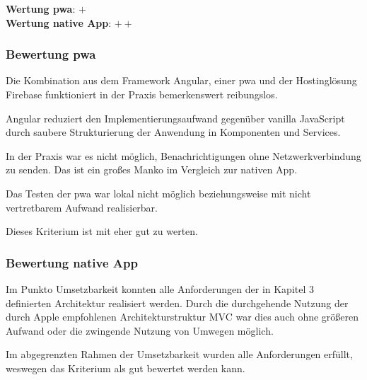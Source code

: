 \textbf{Wertung \ac{pwa}}: $+$\\
\textbf{Wertung native App}: $++$ \\

\subsubsection{Bewertung \ac{pwa}}
Die Kombination aus dem Framework Angular, einer \ac{pwa} und der Hostinglösung Firebase funktioniert in der Praxis bemerkenswert reibungslos.

Angular reduziert den Implementierungsaufwand gegenüber vanilla JavaScript durch saubere Strukturierung der Anwendung in Komponenten und Services.

In der Praxis war es nicht möglich, Benachrichtigungen ohne Netzwerkverbindung zu senden. Das ist ein großes Manko im Vergleich zur nativen App.

Das Testen der \ac{pwa} war lokal nicht möglich beziehungsweise mit nicht vertretbarem Aufwand realisierbar.

Dieses Kriterium ist mit eher gut zu werten.

\subsubsection{Bewertung native App}
Im Punkto Umsetzbarkeit konnten alle Anforderungen der in Kapitel 3 definierten Architektur realisiert werden. Durch die durchgehende Nutzung der durch Apple empfohlenen Architekturstruktur MVC war dies auch ohne größeren Aufwand oder die zwingende Nutzung von Umwegen möglich.

Im abgegrenzten Rahmen der Umsetzbarkeit wurden alle Anforderungen erfüllt, weswegen das Kriterium als gut bewertet werden kann.